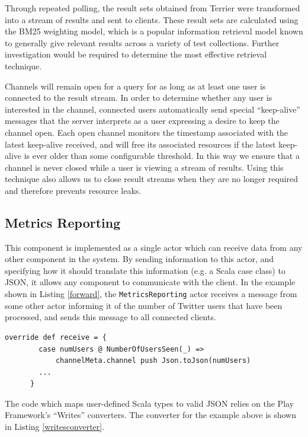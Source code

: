 \documentclass{l4proj}
\newcommand{\code}[1]{\texttt{#1}}
\begin{document}
        Through repeated polling, the result sets obtained from Terrier were transformed into a stream of results and sent to clients. These result sets are calculated using the BM25 weighting model, which is a popular information retrieval model known to generally give relevant results across a variety of test collections. Further investigation would be required to determine the most effective retrieval technique.
        
        Channels will remain open for a query for as long as at least one user is connected to the result stream. In order to determine whether any user is interested in the channel, connected users automatically send special ``keep-alive'' messages that the server interprets as a user expressing a desire to keep the channel open. Each open channel monitors the timestamp associated with the latest keep-alive received, and will free its associated resources if the latest keep-alive is ever older than some configurable threshold. In this way we ensure that a channel is never closed while a user is viewing a stream of results. Using this technique also allows us to close result streams when they are no longer required and therefore prevents resource leaks.
        
     
        
    \subsection{Metrics Reporting}
    This component is implemented as a single actor which can receive data from any other component in the system. By sending information to this actor, and specifying how it should translate this information (e.g. a Scala case class) to JSON, it allows any component to communicate with the client. In the example shown in Listing \ref{forward}, the \code{MetricsReporting} actor receives a message from some other actor informing it of the number of Twitter users that have been processed, and sends this message to all connected clients.
    
    \begin{lstlisting}[caption=Forwarding new messages through the WebSocket to connected clients.,label=forward]
      override def receive = {
        case numUsers @ NumberOfUsersSeen(_) => 
            channelMeta.channel push Json.toJson(numUsers)
        ...
      }
    \end{lstlisting}

The code which maps user-defined Scala types to valid JSON relies on the Play Framework's ``Writes'' converters. The converter for the example above is shown in Listing \ref{writesconverter}.
\end{document}
